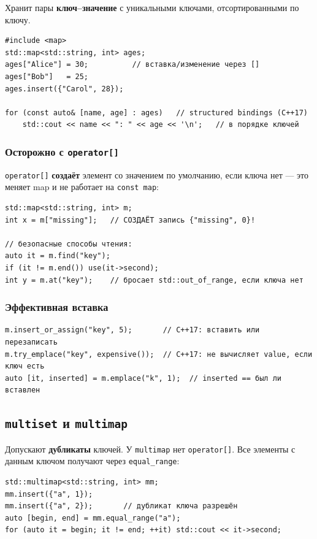 Хранит пары \textbf{ключ--значение} с уникальными ключами, отсортированными по
ключу.

\begin{lstlisting}
#include <map>
std::map<std::string, int> ages;
ages["Alice"] = 30;          // вставка/изменение через []
ages["Bob"]   = 25;
ages.insert({"Carol", 28});

for (const auto& [name, age] : ages)   // structured bindings (C++17)
    std::cout << name << ": " << age << '\n';   // в порядке ключей
\end{lstlisting}

\subsubsection{Осторожно с \texttt{operator[]}}

\texttt{operator[]} \textbf{создаёт} элемент со значением по умолчанию, если ключа
нет --- это меняет map и не работает на \texttt{const map}:

\begin{lstlisting}
std::map<std::string, int> m;
int x = m["missing"];   // СОЗДАЁТ запись {"missing", 0}!

// безопасные способы чтения:
auto it = m.find("key");
if (it != m.end()) use(it->second);
int y = m.at("key");    // бросает std::out_of_range, если ключа нет
\end{lstlisting}

\subsubsection{Эффективная вставка}

\begin{lstlisting}
m.insert_or_assign("key", 5);       // C++17: вставить или перезаписать
m.try_emplace("key", expensive());  // C++17: не вычисляет value, если ключ есть
auto [it, inserted] = m.emplace("k", 1);  // inserted == был ли вставлен
\end{lstlisting}

\subsection{\texttt{multiset} и \texttt{multimap}}

Допускают \textbf{дубликаты} ключей. У \texttt{multimap} нет \texttt{operator[]}.
Все элементы с данным ключом получают через \texttt{equal\_range}:

\begin{lstlisting}
std::multimap<std::string, int> mm;
mm.insert({"a", 1});
mm.insert({"a", 2});       // дубликат ключа разрешён
auto [begin, end] = mm.equal_range("a");
for (auto it = begin; it != end; ++it) std::cout << it->second;
\end{lstlisting}

